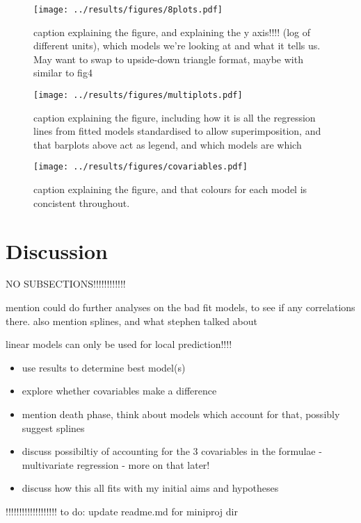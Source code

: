 \documentclass[11pt]{article}
\begin{document}
\begin{figure}
    \centering
    \texttt{[image: ../results/figures/8plots.pdf]} 
    \caption{caption explaining the figure, and explaining the y axis!!!! (log of different units), which models we're looking at and what it tells us. May want to swap to upside-down triangle format, maybe with similar to fig4}
\end{figure}




\begin{figure*}
    \centering
    \texttt{[image: ../results/figures/multiplots.pdf]} %
    \caption{caption explaining the figure, including how it is all the regression lines from fitted models standardised to allow superimposition, and that barplots above act as legend, and which models are which}
\end{figure*}





\begin{figure*}
    \centering
    \texttt{[image: ../results/figures/covariables.pdf]} %
    \caption{caption explaining the figure, and that colours for each model is concistent throughout.  }
\end{figure*}





\newpage


\section{Discussion}%

NO SUBSECTIONS!!!!!!!!!!!!

mention could do further analyses on the bad fit models, to see if any correlations there. also mention splines, and what stephen talked about

linear models can only be used for local prediction!!!!


\begin{itemize}
    \item use results to determine best model(s)
    \item explore whether covariables make a difference
    \item mention death phase, think about models which account for that, possibly suggest splines
    \item discuss possibiltiy of accounting for the 3 covariables in the formulae - multivariate regression - more on that later!
    \item discuss how this all fits with my initial aims and hypotheses
\end{itemize}



!!!!!!!!!!!!!!!!!!!
to do: update readme.md for miniproj dir

\newpage
\printbibliography
\end{document}
